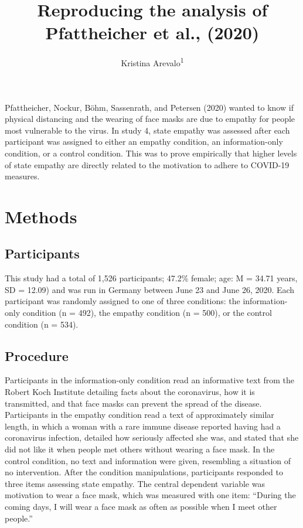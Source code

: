 \documentclass[
  english,
  man]{apa6}
\title{Reproducing the analysis of Pfattheicher et al., (2020)}
\author{Kristina Arevalo\textsuperscript{1}}
\date{}
\affiliation{\vspace{0.5cm}\textsuperscript{1} Brooklyn College of the City University of New York}
\begin{document}
\maketitle

Pfattheicher, Nockur, Böhm, Sassenrath, and Petersen (2020) wanted to know if physical distancing and the wearing of face masks are due to empathy for people most vulnerable to the virus. In study 4, state empathy was assessed after each participant was assigned to either an empathy condition, an information-only condition, or a control condition. This was to prove empirically that higher levels of state empathy are directly related to the motivation to adhere to COVID-19 measures.

\newpage

\hypertarget{methods}{%
\section{Methods}\label{methods}}

\hypertarget{participants}{%
\subsection{Participants}\label{participants}}

This study had a total of 1,526 participants; 47.2\% female; age: M = 34.71 years, SD = 12.09) and was run in Germany between June 23 and June 26, 2020. Each participant was randomly assigned to one of three conditions: the information-only condition (n = 492), the empathy condition (n = 500), or the control condition (n = 534).

\hypertarget{procedure}{%
\subsection{Procedure}\label{procedure}}

Participants in the information-only condition read an informative text from the Robert Koch Institute detailing facts about the coronavirus, how it is transmitted, and that face masks can prevent the spread of the disease. Participants in the empathy condition read a text of approximately similar length, in which a woman with a rare immune disease reported having had a coronavirus infection, detailed how seriously affected she was, and stated that she did not like it when people met others without wearing a face mask. In the control condition, no text and information were given, resembling a situation of no intervention. After the condition manipulations, participants responded to three items assessing state empathy. The central dependent variable was motivation to wear a face mask, which was measured with one item: \enquote{During the coming days, I will wear a face mask as often as possible when I meet other people.}
\end{document}
